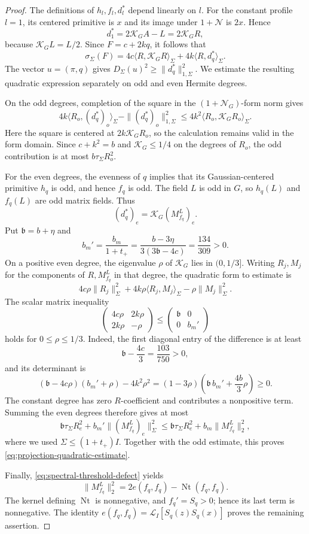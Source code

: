 \begin{proof}
The definitions of $h_l,f_l,d_l^*$ depend linearly on $l$. For the constant profile $l=1$, its centered primitive is $x$ and its image under $1+\mathcal{N}$ is $2x$.  Hence
\[
 d_1^*=2\mathcal{K}_G A-L=2\mathcal{K}_G R,
\]
because $\mathcal{K}_G L=L/2$. Since $F=c+2kq$, it follows that
\[
 \sigma_\Sigma(F)
 =4c\langle R,\mathcal{K}_G R\rangle_\Sigma
       +4k\langle R,d_q^*\rangle_\Sigma.
\]
The vector $u=(\pi,q)$ gives $D_\Sigma(u)^2\ge\|d_q^*\|_{1,\Sigma}^2$. We estimate the resulting quadratic expression separately on odd and even Hermite degrees.

On the odd degrees, completion of the square in the $(1+\mathcal{N}_G)$-form norm gives
\[
 4k\langle R_o,(d_q^*)_o\rangle_\Sigma
       -\|(d_q^*)_o\|_{1,\Sigma}^2
 \le 4k^2\langle R_o,\mathcal{K}_G R_o\rangle_\Sigma.
\]
Here the square is centered at $2k\mathcal{K}_G R_o$, so the calculation remains valid in the form domain.  Since $c+k^2=b$ and $\mathcal{K}_G\le1/4$ on the degrees of $R_o$, the odd contribution is at most $b\tau_\Sigma R_o^2$.

For the even degrees, the evenness of $q$ implies that its Gaussian-centered primitive $h_q$ is odd, and hence $f_q$ is odd.  The field $L$ is odd in $G$, so $h_q(L)$ and $f_q(L)$ are odd matrix fields.  Thus
\[
 (d_q^*)_e=\mathcal{K}_G(M_{f_q}^L)_e.
\]
Put $\mathfrak{b}=b+\eta$ and
\[
 b_m'=\frac{b_m}{1+t_+}
      =\frac{b-3\eta}{3(3\mathfrak{b}-4c)}=\frac{134}{309}>0.
\]
On a positive even degree, the eigenvalue $\rho$ of $\mathcal{K}_G$ lies in $(0,1/3]$. Writing $R_j,M_j$ for the components of $R,M_{f_q}^L$ in that degree, the quadratic form to estimate is
\[
 4c\rho\|R_j\|_\Sigma^2
       +4k\rho\langle R_j,M_j\rangle_\Sigma-\rho\|M_j\|_\Sigma^2.
\]
The scalar matrix inequality
\[
 \begin{pmatrix}4c\rho&2k\rho\\2k\rho&-\rho\end{pmatrix}
 \le
 \begin{pmatrix}\mathfrak{b}&0\\0&b_m'\end{pmatrix}
\]
holds for $0\le\rho\le1/3$.  Indeed, the first diagonal entry of the difference is at least
\[
 \mathfrak{b}-\frac{4c}{3}=\frac{103}{750}>0,
\]
and its determinant is
\[
 (\mathfrak{b}-4c\rho)(b_m'+\rho)-4k^2\rho^2
 =(1-3\rho)\left(\mathfrak{b}\,b_m'+\frac{4b}{3}\rho\right)\ge0.
\]
The constant degree has zero $R$-coefficient and contributes a nonpositive term.  Summing the even degrees therefore gives at most
\[
 \mathfrak{b}\tau_\Sigma R_e^2
       +b_m'\|(M_{f_q}^L)_e\|_\Sigma^2
 \le \mathfrak{b}\tau_\Sigma R_e^2+b_m\|M_{f_q}^L\|_2^2,
\]
where we used $\Sigma\le(1+t_+)I$. Together with the odd estimate, this proves \eqref{eq:projection-quadratic-estimate}.

Finally, \eqref{eq:spectral-threshold-defect} yields
\[
 \|M_{f_q}^L\|_2^2
 =2e(f_q,f_q)-\operatorname{Nt}(f_q,f_q).
\]
The kernel defining $\operatorname{Nt}$ is nonnegative, and $f_q'=S_q>0$; hence its last term is nonnegative. The identity $e(f_q,f_q)=\mathcal{L}_I[S_q(z)S_q(x)]$ proves the remaining assertion.
\end{proof}

